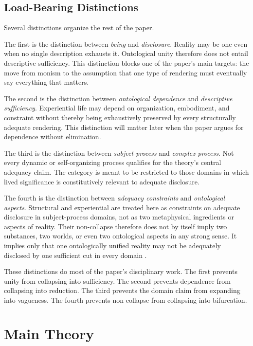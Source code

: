 \documentclass[11pt]{article}
\renewcommand{\emph}[1]{\textit{#1}}
\begin{document}
\subsection{Load-Bearing Distinctions}

Several distinctions organize the rest of the paper.

The first is the distinction between \emph{being} and \emph{disclosure}. Reality may be one even when no single description exhausts it. Ontological unity therefore does not entail descriptive sufficiency. This distinction blocks one of the paper's main targets: the move from monism to the assumption that one type of rendering must eventually say everything that matters.

The second is the distinction between \emph{ontological dependence} and \emph{descriptive sufficiency}. Experiential life may depend on organization, embodiment, and constraint without thereby being exhaustively preserved by every structurally adequate rendering. This distinction will matter later when the paper argues for dependence without elimination.

The third is the distinction between \emph{subject-process} and \emph{complex process}. Not every dynamic or self-organizing process qualifies for the theory's central adequacy claim. The category is meant to be restricted to those domains in which lived significance is constitutively relevant to adequate disclosure.

The fourth is the distinction between \emph{adequacy constraints} and \emph{ontological aspects}. Structural and experiential are treated here as constraints on adequate disclosure in subject-process domains, not as two metaphysical ingredients or aspects of reality. Their non-collapse therefore does not by itself imply two substances, two worlds, or even two ontological aspects in any strong sense. It implies only that one ontologically unified reality may not be adequately disclosed by one sufficient cut in every domain \cite{Nagel1974,Levine1983}.

These distinctions do most of the paper's disciplinary work. The first prevents unity from collapsing into sufficiency. The second prevents dependence from collapsing into reduction. The third prevents the domain claim from expanding into vagueness. The fourth prevents non-collapse from collapsing into bifurcation.
\section{Main Theory}
\end{document}

